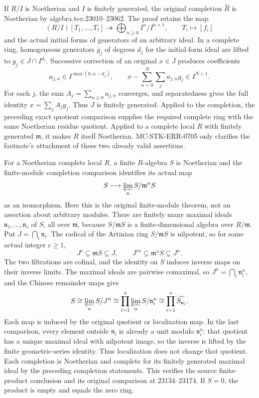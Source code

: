 If \(R/I\) is Noetherian and \(I\) is finitely generated, the original completion \(\widehat R\) is Noetherian by algebra.tex:23010--23062. The proof retains the map \[
 (R/I)[T_1,\ldots,T_t]\twoheadrightarrow
 \bigoplus_{n\geq0}I^n/I^{n+1},\qquad T_i\longmapsto[f_i]
\] and the actual initial forms of generators of an arbitrary ideal. In a complete ring, homogeneous generators \(\overline g_j\) of degrees \(d_j\) for the initial-form ideal are lifted to \(g_j\in J\cap I^{d_j}\). Successive correction of an original \(x\in J\) produces coefficients \[
 a_{j,n}\in I^{\max(0,n-d_j)},\qquad
 x-\sum_{n=0}^{N}\sum_j a_{j,n}g_j\in I^{N+1}.
\] For each \(j\), the sum \(A_j=\sum_{n\geq0}a_{j,n}\) converges, and separatedness gives the full identity \(x=\sum_j A_jg_j\). Thus \(J\) is finitely generated. Applied to the completion, the preceding exact quotient comparison supplies the required complete ring with the same Noetherian residue quotient. Applied to a complete local \(R\) with finitely generated \(\mathfrak m\), it makes \(R\) itself Noetherian. MC-STK-ERR-0705 only clarifies the footnote's attachment of these two already valid assertions.

For a Noetherian complete local \(R\), a finite \(R\)-algebra \(S\) is Noetherian and the finite-module completion comparison identifies its actual map \[
 S\longrightarrow\varprojlim_n S/\mathfrak m^nS
\] as an isomorphism. Here this is the original finite-module theorem, not an assertion about arbitrary modules. There are finitely many maximal ideals \(\mathfrak n_1,\ldots,\mathfrak n_s\) of \(S\), all over \(\mathfrak m\), because \(S/\mathfrak mS\) is a finite-dimensional algebra over \(R/\mathfrak m\). Put \(J=\bigcap_i\mathfrak n_i\). The radical of the Artinian ring \(S/\mathfrak mS\) is nilpotent, so for some actual integer \(c\geq1\), \[
 J^c\subseteq\mathfrak mS\subseteq J,\qquad
 J^{cn}\subseteq\mathfrak m^nS\subseteq J^n.
\] The two filtrations are cofinal, and the identity on \(S\) induces inverse maps on their inverse limits. The maximal ideals are pairwise comaximal, so \(J^n=\bigcap_i\mathfrak n_i^n\), and the Chinese remainder maps give \[
 S\cong\varprojlim_n S/J^n
   \cong\prod_{i=1}^{s}\varprojlim_n S/\mathfrak n_i^n
   \cong\prod_{i=1}^{s}\widehat{S_{\mathfrak n_i}}.
\] Each map is induced by the original quotient or localization map. In the last comparison, every element outside \(\mathfrak n_i\) is already a unit modulo \(\mathfrak n_i^n\): that quotient has a unique maximal ideal with nilpotent image, so the inverse is lifted by the finite geometric-series identity. Thus localization does not change that quotient. Each completion is Noetherian and complete for its finitely generated maximal ideal by the preceding completion statements. This verifies the source finite-product conclusion and its original comparison at 23134--23174. If \(S=0\), the product is empty and equals the zero ring.

